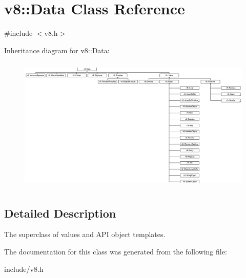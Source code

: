 \hypertarget{classv8_1_1_data}{}\section{v8\+:\+:Data Class Reference}
\label{classv8_1_1_data}


{\ttfamily \#include $<$v8.\+h$>$}

Inheritance diagram for v8\+:\+:Data\+:\begin{figure}[H]
\begin{center}
\leavevmode
\includegraphics[height=6.491763cm]{classv8_1_1_data}
\end{center}
\end{figure}


\subsection{Detailed Description}
The superclass of values and A\+PI object templates. 

The documentation for this class was generated from the following file\+:\begin{DoxyCompactItemize}
\item 
include/v8.\+h\end{DoxyCompactItemize}
